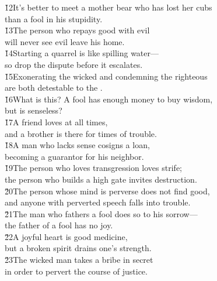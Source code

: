 \begin{poetry}
\poeml \v{12}It's better to meet a mother bear who has lost her cubs \\
\poemll    than a fool in his stupidity. \\
\poeml \v{13}The person who repays good with evil \\
\poemll    will never see evil leave his home. \\
\poeml \v{14}Starting a quarrel is like spilling water--- \\
\poemll    so drop the dispute before it escalates. \\
\poeml \v{15}Exonerating the wicked and condemning the righteous \\
\poemll    are both detestable to the . \\
\poeml \v{16}What is this? A fool has enough money to buy wisdom, \\
\poemll    but is senseless? \\
\poeml \v{17}A friend loves at all times, \\
\poemll    and a brother is there for times of trouble. \\
\poeml \v{18}A man who lacks sense cosigns a loan, \\
\poemll    becoming a guarantor for his neighbor. \\
\poeml \v{19}The person who loves transgression loves strife; \\
\poemll    the person who builds a high gate invites destruction. \\
\poeml \v{20}The person whose mind is perverse does not find good, \\
\poemll    and anyone with perverted speech falls into trouble. \\
\poeml \v{21}The man who fathers a fool does so to his sorrow--- \\
\poemll    the father of a fool has no joy. \\
\poeml \v{22}A joyful heart is good medicine, \\
\poemll    but a broken spirit drains one's strength. \\
\poeml \v{23}The wicked man takes a bribe in secret \\
\poemll    in order to pervert the course of justice. \\

\end{poetry}
